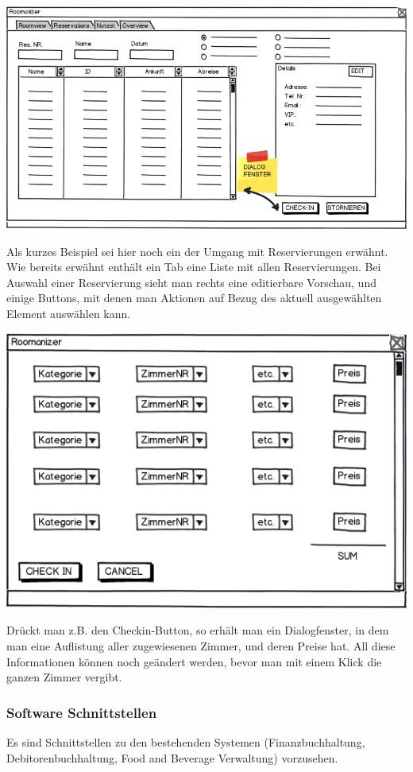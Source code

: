 \documentclass[10pt,a4paper,titlepage]{article}
\begin{document}
\includegraphics[width=\linewidth]{Images/GUI_Overview.png}

Als kurzes Beispiel sei hier noch ein der Umgang mit Reservierungen erwähnt. Wie bereits erwähnt enthält ein Tab eine Liste mit allen Reservierungen. Bei Auswahl einer Reservierung sieht man rechts eine editierbare Vorschau, und einige Buttons, mit denen man Aktionen auf Bezug des aktuell ausgewählten Element auswählen kann.

\includegraphics[width=\linewidth]{Images/GUI_Dialog.png}

Drückt man z.B. den Checkin-Button, so erhält man ein Dialogfenster, in dem man eine Auflistung aller zugewiesenen Zimmer, und deren Preise hat. All diese Informationen können noch geändert werden, bevor man mit einem Klick die ganzen Zimmer vergibt.
\subsubsection{Software Schnittstellen}
Es sind Schnittstellen zu den bestehenden Systemen (Finanzbuchhaltung, Debitorenbuchhaltung, Food and Beverage Verwaltung) vorzusehen.
\end{document}
